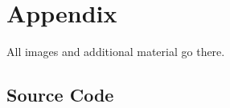 \documentclass[conference,compsoc]{IEEEtran}
\begin{document}
\section{Appendix}
All images and additional material go there.

\subsection{Source Code}

    
    

    
\end{document}
